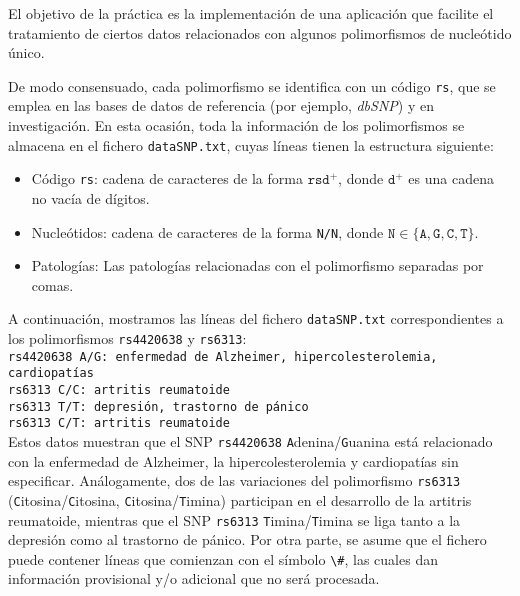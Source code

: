 \documentclass[a4paper,10pt]{article}
\begin{document}
El objetivo de la práctica es la implementación de una aplicación que
facilite el tratamiento de ciertos datos relacionados con algunos
polimorfismos de nucleótido único.

De modo consensuado, cada polimorfismo se identifica con un código \lstinline{rs}, que se emplea en las bases de datos de referencia (por ejemplo, \textit{dbSNP}) y en investigación.
        En esta ocasión, toda la información de los polimorfismos se almacena en el fichero \lstinline{dataSNP.txt}, cuyas líneas tienen la estructura siguiente:
        \begin{itemize}\setlength{\itemsep}{0ex minus0.2ex}\setlength{\parsep}{0.5ex plus0.2ex minus0.1ex}\vspace*{-1ex}
                \item Código \lstinline{rs}: cadena de caracteres de la forma $\mathtt{rsd^{+}}$, donde $\mathtt{d^{+}}$ es una cadena no vacía de dígitos.
                \item Nucleótidos: cadena de caracteres de la forma \lstinline{N/N}, donde $\mathtt{N\!\in\!\{A, G, C, T\}}$.
                     \item Patologías: Las patologías relacionadas con el polimorfismo separadas por comas.
        \end{itemize}\vspace*{-1ex}
        A continuación, mostramos las líneas del fichero \lstinline{dataSNP.txt} correspondientes a los polimorfismos \lstinline{rs4420638} y \lstinline{rs6313}:\\
        \hspace*{3ex}\lstinline{rs4420638 A/G: enfermedad de Alzheimer, hipercolesterolemia, cardiopatías} \\
        \hspace*{3ex}\lstinline{rs6313 C/C: artritis reumatoide} \\
        \hspace*{3ex}\lstinline{rs6313 T/T: depresión, trastorno de pánico} \\
        \hspace*{3ex}\lstinline{rs6313 C/T: artritis reumatoide} \\
        Estos datos muestran que el SNP \lstinline{rs4420638}
        \lstinline{A}denina/\lstinline{G}uanina está relacionado con
        la enfermedad de Alzheimer, la hipercolesterolemia y
        cardiopatías sin especificar. Análogamente, dos de las
        variaciones del polimorfismo \lstinline{rs6313}
        (\lstinline{C}itosina/\lstinline{C}itosina,
        \lstinline{C}itosina/\lstinline{T}imina) participan en el
        desarrollo de la artitris reumatoide, mientras que el SNP
        \lstinline{rs6313} \lstinline{T}imina/\lstinline{T}imina se
        liga tanto a la depresión como al trastorno de pánico. Por
        otra parte, se asume que el fichero puede contener líneas que
        comienzan con el símbolo \lstinline{\#}, las cuales dan
        información provisional y/o adicional que no será procesada.
\end{document}
